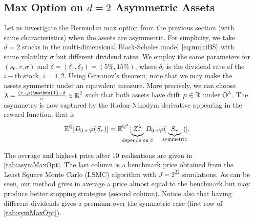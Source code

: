 \subsection{Max Option on $d=2$ Asymmetric Assets }\label{sec:maxCallAsym}

Let us investigate the Bermudan max option from the previous section (with same characteristics) when the assets are  asymmetric. For simplicity, we take $d=2$ 
stocks in the multi-dimensional Black-Scholes model $\eqref{eq:multiBS}$ with same volatility $\sigma$ but different dividend rates. We employ the same parameters for $(s_0,r,\sigma)$ and $\delta = (\delta_1,\delta_2) = (5 \%,15 \%)$, where $\delta_i$ is the dividend rate of the $i-$th stock, $i=1,2$. Using Girsanov's theorem, note that we may make the assets symmetric under an equivalent measure. More precisely, we can choose $\lambda = \frac{(r+\mu)\mathds{1} - \delta}{\sigma} \in \R^2$ such that both assets have drift $\mu \in \operatorname{\mathbb{R}}$ under $\operatorname{\mathbb{Q}}^{\lambda}$.  The asymmetry is now captured by the Radon-Nikodym derivative appearing in the reward function, that is 
\begin{equation}\label{eq:GirsanovAsym}
    \E^{\Q}[D_{0,\tau}\, \varphi(S_{\tau})] =  \E^{\Q^{\lambda}}[\underbrace{Z^{\lambda}_{\tau}}_{\mathclap{\text{depends on $\delta$}}}\, D_{0,\tau} \varphi(\ \underbrace{S_{\tau}}_{\mathclap{\text{symmetric}}} \ )]. 
\end{equation}


The average and highest price after $10$ realisations are given in \cref{tab:asymMaxOpt}. The last column  is a benchmark price obtained from the Least Square Monte Carlo (LSMC) algorithm \cite{LSMC}  with $J =2^{22}$  simulations. As can be seen, our method gives in average a price almost equal to the benchmark but may produce better  stopping strategies (second column). Notice also that having different dividends gives a premium over the symmetric case (first row of \cref{tab:symMaxOpt}).  %


